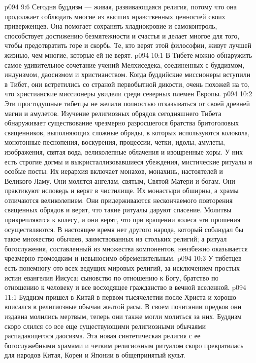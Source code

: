 \vs p094 9:6 Сегодня буддизм --- живая, развивающаяся религия, потому что она продолжает соблюдать многие из высших нравственных ценностей своих приверженцев. Она помогает сохранять хладнокровие и самоконтроль, способствует достижению безмятежности и счастья и делает многое для того, чтобы предотвратить горе и скорбь. Те, кто верят этой философии, живут лучшей жизнью, чем многие, которые ей не верят.
\vs p094 10:1 В Тибете можно обнаружить самое удивительное сочетание учений Мелхиседека, соединенных с буддизмом, индуизмом, даосизмом и христианством. Когда буддийские миссионеры вступили в Тибет, они встретились со страной первобытной дикости, очень похожей на то, что христианские миссионеры увидели среди северных племен Европы.
\vs p094 10:2 Эти простодушные тибетцы не желали полностью отказываться от своей древней магии и амулетов. Изучение религиозных обрядов сегодняшнего Тибета обнаруживает существование чрезмерно разросшегося братства бритоголовых священников, выполняющих сложные обряды, в которых используются колокола, монотонные песнопения, воскурения, процессии, четки, идолы, амулеты, изображения, святая вода, великолепные облачения и изощренные хоры. У них есть строгие догмы и выкристаллизовавшиеся убеждения, мистические ритуалы и особые посты. Их иерархия включает монахов, монахинь, настоятелей и Великого Ламу. Они молятся ангелам, святым, Святой Матери и богам. Они практикуют исповедь и верят в чистилище. Их монастыри обширны, а храмы отличаются великолепием. Они придерживаются нескончаемого повторения священных обрядов и верят, что такие ритуалы даруют спасение. Молитвы прикрепляются к колесу, и они верят, что при вращении колеса эти прошения осуществляются. В настоящее время нет другого народа, который соблюдал бы такое множество обычаев, заимствованных из стольких религий; а ритуал богослужения, составленный из множества компонентов, неизбежно оказывается чрезмерно громоздким и невыносимо обременительным.
\vs p094 10:3 У тибетцев есть понемногу ото всех ведущих мировых религий, за исключением простых истин евангелия Иисуса: сыновство по отношению к Богу, братство по отношению к человеку и все восходящее гражданство в вечной вселенной.
\vs p094 11:1 Буддизм пришел в Китай в первом тысячелетии после Христа и хорошо вписался в религиозные обычаи желтой расы. В своем почитании предков они издавна молились мертвым, теперь они также могли молиться за них. Буддизм скоро слился со все еще существующими религиозными обычаями распадающегося даосизма. Эта новая синтетическая религия с ее богослужебными храмами и четким религиозным ритуалом скоро превратилась для народов Китая, Кореи и Японии в общепринятый культ.
